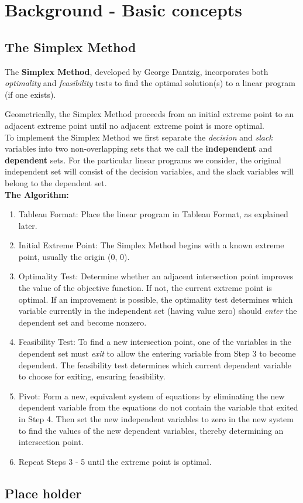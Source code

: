 \newpage
\section{Background - Basic concepts}
	\subsection{The Simplex Method}

\qquad The \textbf{Simplex Method}, developed by George Dantzig, incorporates both \textit{optimality} and \textit{feasibility} tests to find the optimal solution(s) to a linear program (if one exists). 

Geometrically, the Simplex Method
proceeds from an initial extreme point to an adjacent extreme point until no adjacent extreme
point is more optimal. \\

\qquad To implement the Simplex Method we first separate the \textit{decision} and \textit{slack} variables into two non-overlapping sets that we call the \textbf{independent} and \textbf{dependent} sets. For the particular linear programs we consider, the original independent set will consist of the decision variables, and the slack variables will belong to the dependent set. \\[6pt]

\textbf{The Algorithm:}
\begin{enumerate}
	\item Tableau Format: Place the linear program in Tableau Format, as explained later.
	\item Initial Extreme Point: The Simplex Method begins with a known extreme point, usually
	the origin (0, 0).
	\item Optimality Test: Determine whether an adjacent intersection point improves the value of the objective function. If not, the current extreme point is optimal. If an improvement is possible, the optimality test determines which variable currently in the independent set (having value zero) should \textit{enter} the dependent set and become nonzero.
	\item Feasibility Test: To find a new intersection point, one of the variables in the dependent set must \textit{exit} to allow the entering variable from Step 3 to become dependent. The feasibility test determines which current dependent variable to choose for exiting, ensuring feasibility.
	\item Pivot: Form a new, equivalent system of equations by eliminating the new dependent variable from the equations do not contain the variable that exited in Step 4. Then set
	the new independent variables to zero in the new system to find the values of the new dependent variables, thereby determining an intersection point.
	\item Repeat Steps 3 - 5 until the extreme point is optimal.
	
\end{enumerate}

	\subsection{Place holder}
